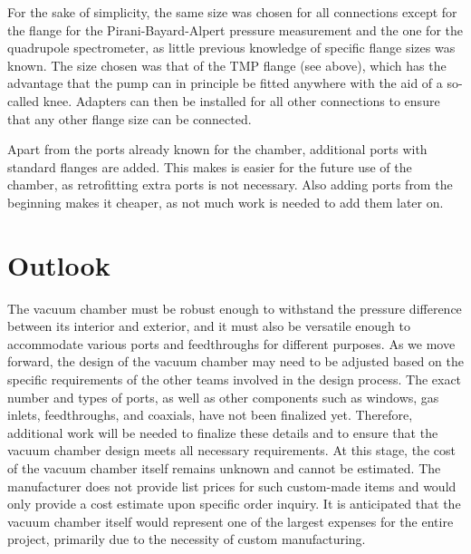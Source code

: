 For the sake of simplicity, the same size was chosen for all connections except for the flange for the Pirani-Bayard-Alpert pressure measurement and the one for the quadrupole spectrometer, as little previous knowledge of specific flange sizes was known.
The size chosen was that of the TMP flange (see above), which has the advantage that the pump can in principle be fitted anywhere with the aid of a so-called knee.
Adapters can then be installed for all other connections to ensure that any other flange size can be connected.

Apart from the ports already known for the chamber, additional ports with standard flanges are added.
This makes is easier for the future use of the chamber, as retrofitting extra ports is not necessary.
Also adding ports from the beginning makes it cheaper, as not much work is needed to add them later on.


\section{Outlook}

The vacuum chamber must be robust enough to withstand the pressure difference between its interior and exterior, and it must also be versatile enough to accommodate various ports and feedthroughs for different purposes.
As we move forward, the design of the vacuum chamber may need to be adjusted based on the specific requirements of the other teams involved in the design process.
The exact number and types of ports, as well as other components such as windows, gas inlets, feedthroughs, and coaxials, have not been finalized yet.
Therefore, additional work will be needed to finalize these details and to ensure that the vacuum chamber design meets all necessary requirements.
At this stage, the cost of the vacuum chamber itself remains unknown and cannot be estimated.
The manufacturer does not provide list prices for such custom-made items and would only provide a cost estimate upon specific order inquiry.
It is anticipated that the vacuum chamber itself would represent one of the largest expenses for the entire project, primarily due to the necessity of custom manufacturing.
